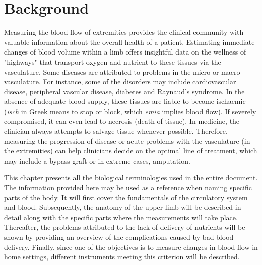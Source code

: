 
\chapter{Background}
\label{chapter background}

\ifpdf
    \graphicspath{{Chapter2/Figs/Raster/}{Chapter2/Figs/PDF/}{Chapter2/Figs/}}
\else
    \graphicspath{{Chapter2/Figs/Vector/}{Chapter2/Figs/}}
\fi

Measuring the blood flow of extremities provides the clinical community with valuable information about the overall health of a patient. Estimating immediate changes of blood volume within a limb offers insightful data on the wellness of "highways" that transport oxygen and nutrient to these tissues via the vasculature. Some diseases are attributed to problems in the micro or macro-vasculature. For instance, some of the disorders may include cardiovascular disease, peripheral vascular disease, diabetes and Raynaud's syndrome. In the absence of adequate blood supply, these tissues are liable to become ischaemic (\textit{isch} in Greek means to stop or block, which \textit{emia} implies blood flow).  If severely compromised, it can even lead to necrosis (death of tissue). In medicine, the clinician always attempts to salvage tissue whenever possible. Therefore, measuring the progression of disease or acute problems with the vasculature (in the extremities) can help clinicians decide on the optimal line of treatment, which may include a bypass graft or in extreme cases, amputation.

This chapter presents all the biological terminologies used in the entire document. The information provided here may be used as a reference when naming specific parts of the body. It will first cover the fundamentals of the circulatory system and blood. Subsequently, the anatomy of the upper limb will be described in detail along with the specific parts where the measurements will take place. Thereafter, the problems attributed to the lack of delivery of nutrients will be shown by providing an overview of the complications caused by bad blood delivery. Finally, since one of the objectives is to measure changes in blood flow in home settings, different instruments meeting this criterion will be described.   

